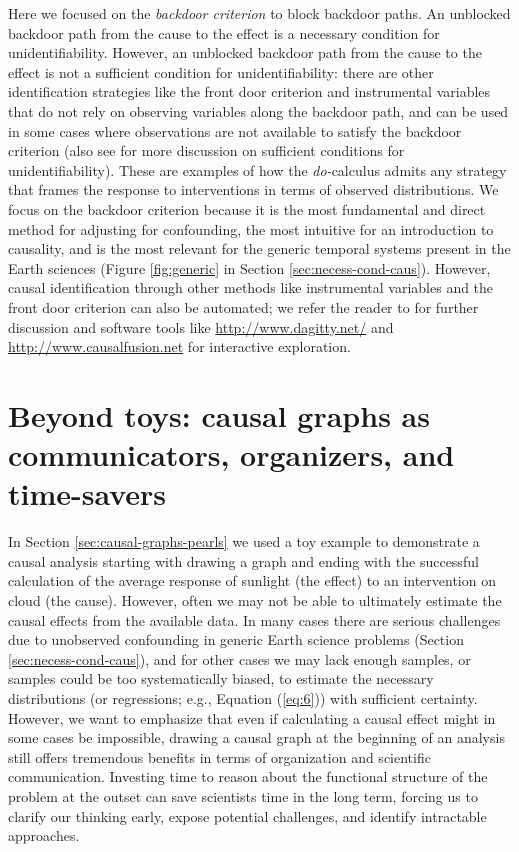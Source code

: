 \documentclass[12pt]{article}
\begin{document}
Here we focused on the \emph{backdoor criterion} to block backdoor
paths. An unblocked backdoor path from the cause to the effect is a
necessary condition for unidentifiability. However, an unblocked
backdoor path from the cause to the effect is not a sufficient
condition for unidentifiability: there are other identification
strategies like the front door criterion \citep[see Section 3.5.2
in][]{pearl2009causality} and instrumental variables \citep[see
Chapter 8 in][]{pearl2009causality} that do not rely on observing
variables along the backdoor path, and can be used in some cases where
observations are not available to satisfy the backdoor criterion (also
see \citet{tian2002general} for more discussion on sufficient
conditions for unidentifiability). These are examples of how the
\textit{do-}calculus admits any strategy that frames the response to
interventions in terms of observed distributions. We focus on the
backdoor criterion because it is the most fundamental and direct
method for adjusting for confounding, the most intuitive for an
introduction to causality, and is the most relevant for the generic
temporal systems present in the Earth sciences (Figure
\ref{fig:generic} in Section \ref{sec:necess-cond-caus}). However,
causal identification through other methods like instrumental
variables and the front door criterion can also be automated; we refer
the reader to \citet{pearl2009causality} for further discussion and
software tools like \url{http://www.dagitty.net/} and
\url{http://www.causalfusion.net} for interactive exploration.


\section{Beyond toys: causal graphs as communicators, organizers, and
  time-savers}\label{sec:causal-graphs-as}

In Section \ref{sec:causal-graphs-pearls} we used a toy example to
demonstrate a causal analysis starting with drawing a graph and ending
with the successful calculation of the average response of sunlight
(the effect) to an intervention on cloud (the cause). However, often
we may not be able to ultimately estimate the causal effects from the
available data. In many cases there are serious challenges due to
unobserved confounding in generic Earth science problems (Section
\ref{sec:necess-cond-caus}), and for other cases we may lack enough
samples, or samples could be too systematically biased, to estimate
the necessary distributions (or regressions; e.g., Equation
(\ref{eq:6})) with sufficient certainty. However, we want to
emphasize that even if calculating a causal effect might in some
cases be impossible, drawing a causal graph at the beginning of an
analysis still offers tremendous benefits in terms of organization and
scientific communication. Investing time to reason about the
functional structure of the problem at the outset can save scientists
time in the long term, forcing us to clarify our thinking early,
expose potential challenges, and identify intractable approaches.
\end{document}
